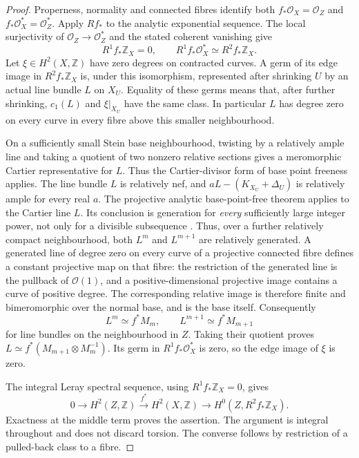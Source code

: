 \begin{proof}
Properness, normality and connected fibres identify both
$f_*\mathcal O_X=\mathcal O_Z$ and
$f_*\mathcal O_X^*=\mathcal O_Z^*$. Apply $Rf_*$ to the analytic
exponential sequence. The local surjectivity of
$\mathcal O_Z\to\mathcal O_Z^*$ and the stated coherent vanishing give
\[
 R^1f_*\mathbb Z_X=0,
 \qquad
 R^1f_*\mathcal O_X^*\simeq R^2f_*\mathbb Z_X.
\]
Let $\xi\in H^2(X,\mathbb Z)$ have zero degrees on contracted curves.
A germ of its edge image in $R^2f_*\mathbb Z_X$ is, under this
isomorphism, represented after shrinking $U$ by an actual line bundle
$L$ on $X_U$. Equality of these germs means that, after further
shrinking, $c_1(L)$ and $\xi|_{X_U}$ have the same class. In particular
$L$ has degree zero on every curve in every fibre above this smaller
neighbourhood.

On a sufficiently small Stein base neighbourhood, twisting by a
relatively ample line and taking a quotient of two nonzero relative
sections gives a meromorphic Cartier representative for $L$. Thus
the Cartier-divisor form of base point freeness applies.
The line bundle $L$ is relatively nef, and
$aL-(K_{X_U}+\Delta_U)$ is relatively ample for every real $a$.
The projective analytic base-point-free theorem applies to the Cartier
line $L$. Its conclusion is generation for \emph{every} sufficiently
large integer power, not only for a divisible subsequence
\cite[Theorems~6.2 and~6.5]{FujinoAnalyticBCHM}. Thus, over a further relatively compact
neighbourhood, both $L^m$ and $L^{m+1}$ are relatively generated.
A generated line of degree zero on every curve of a projective connected
fibre defines a constant projective map on that fibre: the restriction
of the generated line is the pullback of $\mathcal O(1)$, and a
positive-dimensional projective image contains a curve of positive
degree. The corresponding relative image is therefore finite and
bimeromorphic over the normal base, and is the base itself. Consequently
\[
 L^m\simeq f^*M_m,\qquad L^{m+1}\simeq f^*M_{m+1}
\]
for line bundles on the neighbourhood in $Z$. Taking their quotient
proves $L\simeq f^*(M_{m+1}\otimes M_m^{-1})$. Its germ in
$R^1f_*\mathcal O_X^*$ is zero, so the edge image of $\xi$ is zero.

The integral Leray spectral sequence, using
$R^1f_*\mathbb Z_X=0$, gives
\[
 0\longrightarrow H^2(Z,\mathbb Z)
 \xrightarrow{f^*}H^2(X,\mathbb Z)
 \longrightarrow H^0(Z,R^2f_*\mathbb Z_X).
\]
Exactness at the middle term proves the assertion. The argument is
integral throughout and does not discard torsion. The converse follows
by restriction of a pulled-back class to a fibre.
\end{proof}

